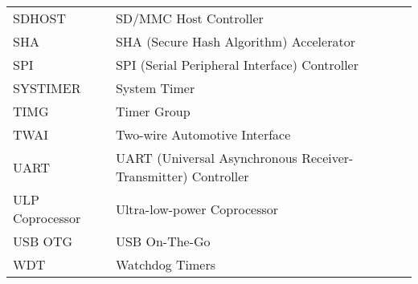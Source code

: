 \begin{longtable}[c]{ R{3cm} p{12cm} }
SDHOST  & SD/MMC Host Controller \\ %
SHA     & SHA (Secure Hash Algorithm) Accelerator \\
SPI     & SPI (Serial Peripheral Interface) Controller \\
SYSTIMER & System Timer \\ %
TIMG    & Timer Group \\
TWAI    & Two-wire Automotive Interface \\ %
UART    & UART (Universal Asynchronous Receiver-Transmitter) Controller \\ 
ULP Coprocessor & Ultra-low-power Coprocessor \\ %
USB OTG & USB On-The-Go \\ %
WDT & Watchdog Timers \\ 

\end{longtable}








